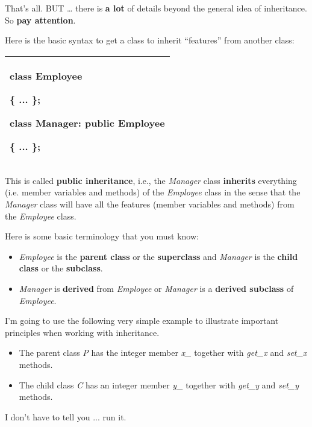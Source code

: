 \documentclass[
]{article}
\providecommand{\tightlist}{%
  \setlength{\itemsep}{0pt}\setlength{\parskip}{0pt}}
\begin{document}
That's all. BUT \ldots{} there is \textbf{a lot} of details beyond the
general idea of inheritance. So \textbf{pay attention}.

Here is the basic syntax to get a class to inherit ``features'' from
another class:

\begin{longtable}[]{@{}l@{}}
\toprule
\endhead
\begin{minipage}[t]{0.97\columnwidth}\raggedright
class Employee

\{ ... \};

class Manager: \textbf{public Employee}

\{ ... \};\strut
\end{minipage}\tabularnewline
\bottomrule
\end{longtable}

This is called \textbf{public inheritance}, i.e., the \emph{Manager}
class \textbf{inherits} everything (i.e. member variables and methods)
of the \emph{Employee} class in the sense that the \emph{Manager} class
will have all the features (member variables and methods) from the
\emph{Employee} class.

Here is some basic terminology that you must know:

\begin{itemize}
\tightlist
\item
  \emph{Employee} is the \textbf{parent class} or the
  \textbf{superclass} and \emph{Manager} is the \textbf{child class} or
  the \textbf{subclass}.
\item
  \emph{Manager} is \textbf{derived} from \emph{Employee} or
  \emph{Manager} is a \textbf{derived subclass} of \emph{Employee}.
\end{itemize}

I'm going to use the following very simple example to illustrate
important principles when working with inheritance.

\begin{itemize}
\tightlist
\item
  The parent class \emph{P} has the integer member \emph{x\_} together
  with \emph{get\_x} and \emph{set\_x} methods.
\item
  The child class \emph{C} has an integer member \emph{y\_} together
  with \emph{get\_y} and \emph{set\_y} methods.
\end{itemize}

I don't have to tell you ... run it.
\end{document}
